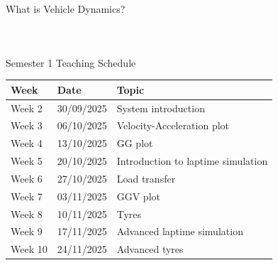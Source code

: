 \begin{frame}{What is Vehicle Dynamics?}
\begin{columns}
\begin{figure}
        \end{figure}
    \end{columns}
\end{frame}

\begin{frame}{Semester 1 Teaching Schedule}
    \begin{table}
        \renewcommand{\arraystretch}{1.5}
        \begin{tabular}{l l l}
            \textbf{Week} & \textbf{Date} & \textbf{Topic} \\
            \hline
            Week 2 & 30/09/2025 & System introduction \\
            Week 3 & 06/10/2025 & Velocity-Acceleration plot \\
            Week 4 & 13/10/2025 & GG plot \\
            Week 5 & 20/10/2025 & Introduction to laptime simulation \\
            Week 6 & 27/10/2025 & Load transfer \\
            Week 7 & 03/11/2025 & GGV plot \\
            Week 8 & 10/11/2025 & Tyres \\
            Week 9 & 17/11/2025 & Advanced laptime simulation \\
            Week 10& 24/11/2025 & Advanced tyres

        \end{tabular}
    \end{table}
\end{frame}